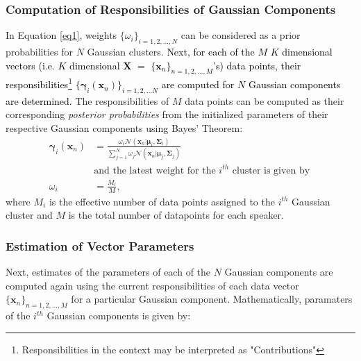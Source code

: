 \documentclass{article}
\begin{document}
{\subsubsection{{Computation of Responsibilities of Gaussian Components}} In Equation \eqref{eq1}, weights $\{\omega_i\}_{i=1,2,\ldots,N}$ can be considered as a prior probabilities for $N$ Gaussian clusters. \textcolor{black}{Next, for each of the $M$ $K$ dimensional vectors (i.e. $K$ dimensional $\bm X$ $=$ $\{\bm x_n\}_{n=1,2,\ldots,M}$'s) data points, their responsibilities\footnote{Responsibilities in the context may be interpreted as "Contributions"} $\{\bm\gamma_i(\bm x_n)\}_{i=1,2,\ldots N}$ are computed for $N$ Gaussian components are determined.} The responsibilities of $M$ data points can be computed as their corresponding \textit{posterior probabilities} from the initialized parameters of their respective Gaussian components using {Bayes' Theorem}:
\begin{align}
\bm\gamma_i(\bm x_n) &= \frac{\omega_i \bm{\mathcal{N}}(\bm x_n|\bm\mu_i,\bm\Sigma_i)}{\sum\limits_{j=1}^N \omega_j \bm{\mathcal{N}}(\bm x_n|\bm\mu_j,\bm\Sigma_j)}\,\\
~&\text{and the latest weight for the $i^{th}$ cluster is given by}~\nonumber\\	
\omega_i &= \frac{ M_i}{M},
\end{align}
where $ M_i$ is the effective number of data points assigned to the $i^{th}$ Gaussian cluster and $ M$ is the total number of datapoints for each speaker.
\subsubsection{{Estimation of Vector Parameters}} Next, estimates of the parameters of each of the $N$ Gaussian components are computed again using the current responsibilities of each data vector $\{\bm x_n\}_{n=1,2,\ldots,M}$ for a particular Gaussian component. Mathematically, paramaters of the $i^{th}$ Gaussian components is given by:

}
\end{document}

